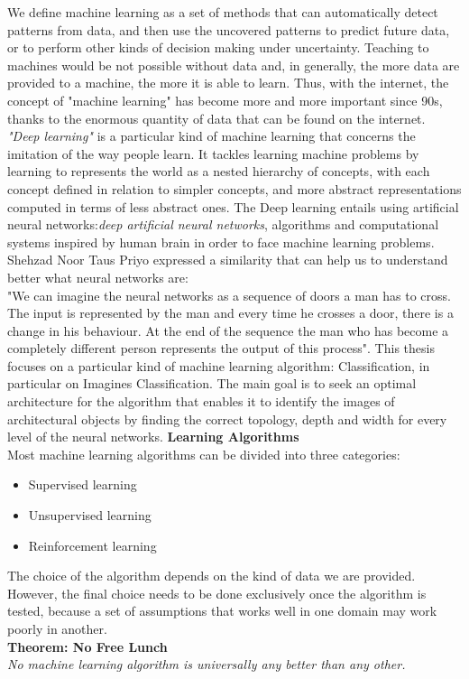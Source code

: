\documentclass[a4paper,12pt]{report}
\begin{document}
We define machine learning as a set of methods that can automatically detect patterns from data, and then use the uncovered patterns to predict future  data, or to perform other kinds of decision making under uncertainty.
Teaching to machines would be not possible without data and, in generally, the more data are provided to a machine, the more it is able to learn. Thus, with the internet, the concept of "machine learning" has become more and more important since 90s, thanks to the enormous quantity of data that can be found on the internet.\\
\textit{"Deep learning"} is a particular kind of machine learning that concerns the imitation of the way people learn. It tackles learning machine problems 
by learning to represents the world as a nested hierarchy of concepts, with 
each concept defined in relation to simpler concepts, and more abstract representations computed in terms of less abstract ones.
The Deep learning entails using artificial neural networks:\textit{deep artificial neural networks}, algorithms and computational systems inspired by human brain in order to face machine learning problems. Shehzad Noor Taus Priyo expressed a similarity that can help us to understand better what neural networks are:\\
"We can imagine the neural networks as a sequence of doors a man has to cross. The input is represented by the man and every time he crosses a door, there is a change in his behaviour. At the end of the sequence the man who has become a completely different person represents the output of this process". 
This thesis focuses on a particular kind of machine learning algorithm: Classification, in particular on Imagines Classification. The main goal is to seek an optimal architecture for the algorithm that enables it to identify the images of architectural objects by finding the correct topology, depth and width for every level of the neural networks.
\newpage
\textbf{Learning Algorithms}\\
Most machine learning algorithms can be divided into three categories:
\begin{itemize}
\item Supervised learning
\item Unsupervised learning
\item Reinforcement learning
\end{itemize}
The choice of the algorithm depends on the kind of data we are provided.\\
However, the final choice needs to be done exclusively once the algorithm is tested,  because a set of assumptions that works well in one domain may work poorly in another.\\
\textbf{Theorem: No Free Lunch}\\
\textit{No machine learning algorithm is universally any better than any other.}\\
\end{document}
